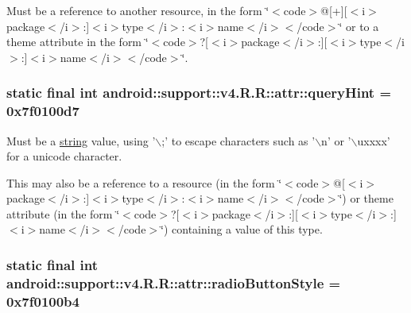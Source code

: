 Must be a reference to another resource, in the form \char`\"{}$<$code$>$@\mbox{[}+\mbox{]}\mbox{[}$<$i$>$package$<$/i$>$:\mbox{]}$<$i$>$type$<$/i$>$:$<$i$>$name$<$/i$>$$<$/code$>$\char`\"{} or to a theme attribute in the form \char`\"{}$<$code$>$?\mbox{[}$<$i$>$package$<$/i$>$:\mbox{]}\mbox{[}$<$i$>$type$<$/i$>$:\mbox{]}$<$i$>$name$<$/i$>$$<$/code$>$\char`\"{}. \hypertarget{classandroid_1_1support_1_1v4_1_1_r_1_1attr_665172d0622865880220861b239f075d}{
\subsubsection[{queryHint}]{\setlength{\rightskip}{0pt plus 5cm}static final int android::support::v4.R.R::attr::queryHint = 0x7f0100d7}}
\label{classandroid_1_1support_1_1v4_1_1_r_1_1attr_665172d0622865880220861b239f075d}


Must be a \hyperlink{classandroid_1_1support_1_1v4_1_1_r_1_1string}{string} value, using '$\backslash$;' to escape characters such as '$\backslash$n' or '$\backslash$uxxxx' for a unicode character. 

This may also be a reference to a resource (in the form \char`\"{}$<$code$>$@\mbox{[}$<$i$>$package$<$/i$>$:\mbox{]}$<$i$>$type$<$/i$>$:$<$i$>$name$<$/i$>$$<$/code$>$\char`\"{}) or theme attribute (in the form \char`\"{}$<$code$>$?\mbox{[}$<$i$>$package$<$/i$>$:\mbox{]}\mbox{[}$<$i$>$type$<$/i$>$:\mbox{]}$<$i$>$name$<$/i$>$$<$/code$>$\char`\"{}) containing a value of this type. \hypertarget{classandroid_1_1support_1_1v4_1_1_r_1_1attr_6802637ac0463fbbe8f0fb02afa18e76}{
\subsubsection[{radioButtonStyle}]{\setlength{\rightskip}{0pt plus 5cm}static final int android::support::v4.R.R::attr::radioButtonStyle = 0x7f0100b4}}
\label{classandroid_1_1support_1_1v4_1_1_r_1_1attr_6802637ac0463fbbe8f0fb02afa18e76}


